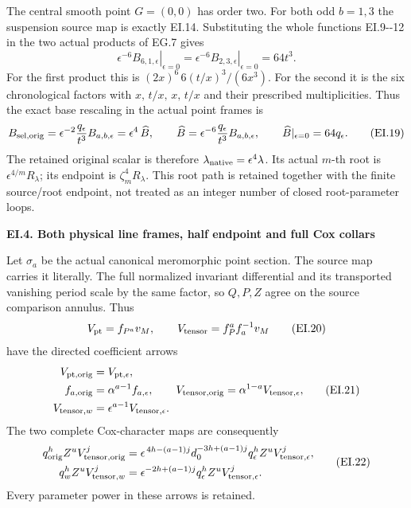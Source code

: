 The central smooth point \(G=(0,0)\) has order two. For both
odd \(b=1,3\) the suspension source map is exactly EI.14.
Substituting the whole functions EI.9-\/-12 in the two actual
products of EG.7 gives
\[
 \left.\epsilon^{-6}B_{6,1,\epsilon}\right|_{\epsilon=0}
 =\left.\epsilon^{-6}B_{2,3,\epsilon}\right|_{\epsilon=0}
 =64t^3 .
 \tag{EI.18}
\]
For the first product this is
\((2x)^6\,6(t/x)^3/(6x^3)\). For the second it is the
six chronological factors with \(x,\,t/x,\,x,\,t/x\) and
their prescribed multiplicities. Thus the exact base rescaling
in the actual point frames is
\[
 B_{{\rm sel},{\rm orig}}
 =\epsilon^{-2}\frac{q_\epsilon}{t^3}B_{a,b,\epsilon}
 =\epsilon^4\,\widehat B,\qquad
 \widehat B=\epsilon^{-6}\frac{q_\epsilon}{t^3}B_{a,b,\epsilon},
 \qquad \widehat B|_{\epsilon=0}=64q_\epsilon.
 \tag{EI.19}
\]
The retained original scalar is therefore
\(\lambda_{\rm native}=\epsilon^4\lambda\). Its actual
\(m\)-th root is \(\epsilon^{4/m}R_\lambda\); its endpoint
is \(\zeta_m^4R_\lambda\). This root path is retained together
with the finite source/root endpoint, not treated as an
integer number of closed root-parameter loops.

\par

\medskip\noindent\textbf{EI.4. Both physical line frames, half endpoint and full Cox collars}

\par\nobreak

Let \(\sigma_a\) be the actual canonical meromorphic point section.
The source map carries it literally. The full normalized
invariant differential and its transported vanishing period
scale by the same factor, so \(Q,P,Z\) agree on the source
comparison annulus. Thus
\[
 V_{\rm pt}=f_{P^a}v_M,\qquad
 V_{\rm tensor}=f_P^a f_a^{-1}v_M
 \tag{EI.20}
\]
have the directed coefficient arrows
\[
 \begin{aligned}
 V_{{\rm pt},{\rm orig}}&=V_{{\rm pt},\epsilon},\\
 f_{a,{\rm orig}}&=\alpha^{a-1}f_{a,\epsilon},\qquad
 V_{{\rm tensor},{\rm orig}}
       =\alpha^{1-a}V_{{\rm tensor},\epsilon},\\
 V_{{\rm tensor},w}&=\epsilon^{a-1}V_{{\rm tensor},\epsilon}.
 \end{aligned}
 \tag{EI.21}
\]
The two complete Cox-character maps are consequently
\[
 \begin{aligned}
 q_{\rm orig}^h Z^u V_{{\rm tensor},{\rm orig}}^j
 &=\epsilon^{\,4h-(a-1)j}d_0^{-3h+(a-1)j}
       q_\epsilon^hZ^uV_{{\rm tensor},\epsilon}^j,\\
 q_w^h Z^u V_{{\rm tensor},w}^j
 &=\epsilon^{-2h+(a-1)j}
       q_\epsilon^hZ^uV_{{\rm tensor},\epsilon}^j.
 \end{aligned}
 \tag{EI.22}
\]
Every parameter power in these arrows is retained.


